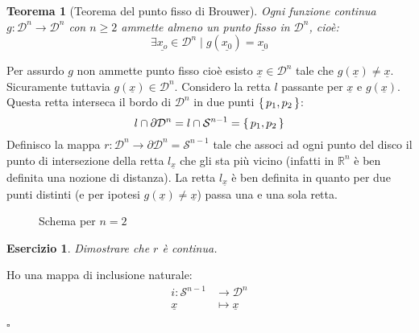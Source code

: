 \documentclass[10pt, twoside=false, x11names]{scrbook}
\newtheorem{theorem}{Teorema}[section]
\newcounter{exercises}
\newtheorem{exercise}[exercises]{Esercizio}
\newenvironment{proof}{{\textbf{Dimostrazione}:}}{\hfill $\square$}
\newcommand{\RN}[1][]{\mathbb{R}^#1}
\newcommand{\Sph}[1][]{\mathcal{S}^#1}
\newcommand{\Disk}[1][]{\mathcal{D}^#1}
\renewcommand{\vec}[1]{\underline{#1}}
\begin{document}
\begin{theorem}[Teorema del punto fisso di Brouwer]
  Ogni funzione continua $ g \colon \Disk{n} \to \Disk{n} $ con $ n \geq 2 $ ammette almeno un punto fisso
  in $ \Disk{n} $, cioè:
  \[
    \exists \vec{x_o} \in \Disk{n} \; | \; g(\vec{x_0}) = \vec{x_0}
  \]
\end{theorem}

\begin{proof}
  Per assurdo $ g $ non ammette punto fisso cioè esisto $ \vec{x} \in \Disk{n} $
  tale che $ g(\vec{x}) \not = \vec{x} $. Sicuramente tuttavia $ g(\vec{x}) \in \Disk{n} $.
  Considero la retta $ l $ passante per $ \vec{x} $ e $ g(\vec{x}) $. Questa retta
  interseca il bordo di $ \Disk{n} $ in due punti $ \set{p_1, p_2} $:
  \[
    l \cap \partial \Disk{n} = l \cap \Sph{n-1} = \set{p_1, p_2}
  \]
  Definisco la mappa $ r \colon \Disk{n} \to \partial \Disk{n} = \Sph{n-1} $ tale che associ
  ad ogni punto del disco il punto di intersezione della retta $ l_{\vec{x}} $ che gli sta più
  vicino (infatti in $ \RN{n} $ è ben definita una nozione di distanza). La retta $ l_{\vec{x}} $
  è ben definita in quanto per due punti distinti (e per ipotesi  $ g(\vec{x}) \not = \vec{x} $)
  passa una e una sola retta.
  \begin{figure}[htbp]
    \centering
    \caption{Schema per $ n = 2 $}
    \label{fig:lez7:brouwer_proof_1}
  \end{figure}
  \begin{exercise}
    Dimostrare che $ r $ è continua.
  \end{exercise}
  Ho una mappa di inclusione naturale:
  \begin{align*}
      i \colon \Sph{n-1} & \to \Disk{n} \\
      \vec{x} & \mapsto \vec{x}
  \end{align*}

\end{proof}
\end{document}
